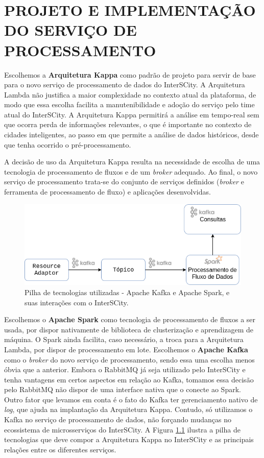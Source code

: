 \chapter[PROJETO E IMPLEMENTAÇÃO DO SERVIÇO DE PROCESSAMENTO]{PROJETO E IMPLEMENTAÇÃO DO SERVIÇO DE PROCESSAMENTO}

\label{chapter:architecture}

Escolhemos a \textbf{Arquitetura Kappa} como padrão de projeto para servir
de base para o novo serviço de processamento de dados do InterSCity.
A Arquitetura Lambda não justifica a maior complexidade no contexto atual da
plataforma, de modo que essa escolha facilita a manutenibilidade e adoção do
serviço pelo time atual do InterSCity. A Arquitetura Kappa permitirá a análise
em tempo-real sem que ocorra perda de informações relevantes, o que é
importante no contexto de cidades inteligentes, ao passo em que permite a
análise de dados históricos, desde que tenha ocorrido o pré-processamento.

A decisão de uso da Arquitetura Kappa resulta na necessidade de escolha de uma
tecnologia de processamento de fluxos e de um \textit{broker} adequado. Ao
final, o novo serviço de processamento trata-se do conjunto de serviços
definidos (\textit{broker} e ferramenta de processamento de fluxo) e aplicações
desenvolvidas.

\begin{figure}[hbt]
  \centering
    \includegraphics[scale=0.5]{figuras/kappa_tools2.png}
  \caption{Pilha de tecnologias utilizadas - Apache Kafka e Apache Spark, e suas
    interações com o InterSCity.}
  \label{fig:stack}
\end{figure}

Escolhemos o \textbf{Apache Spark} como tecnologia de processamento de fluxos
a ser usada, por dispor nativamente de biblioteca de clusterização
e aprendizagem de máquina. O Spark ainda facilita, caso necessário, a
troca para a Arquitetura Lambda, por dispor de processamento em lote.
Escolhemos o \textbf{Apache Kafka} como o \textit{broker} do novo serviço de
processamento, sendo essa uma escolha menos óbvia que a anterior. Embora o
RabbitMQ já seja utilizado pelo InterSCity e tenha vantagens em certos aspectos
em relação ao Kafka, tomamos essa decisão pelo RabbitMQ não dispor de uma
interface nativa que o conecte ao Spark. Outro fator que levamos em conta é o
fato do Kafka ter gerenciamento nativo de \textit{log}, que ajuda na
implantação da Arquitetura Kappa. Contudo, só utilizamos o Kafka no serviço
de processamento de dados, não forçando mudanças no ecossistema de
microsserviços do InterSCity. A Figura \ref{fig:stack} ilustra a pilha de
tecnologias que deve compor a Arquitetura Kappa no InterSCity e as principais
relações entre os diferentes serviços.

